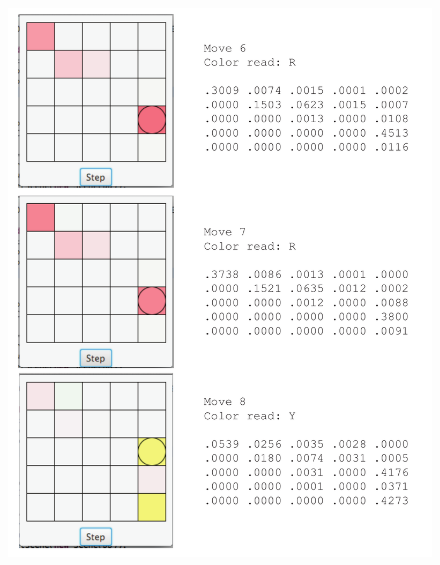\documentclass{article}
\begin{document}
\begin{figure}[H]
\centering
\includegraphics[scale=0.8]{example3.pdf}
\end{figure}
\end{document}
